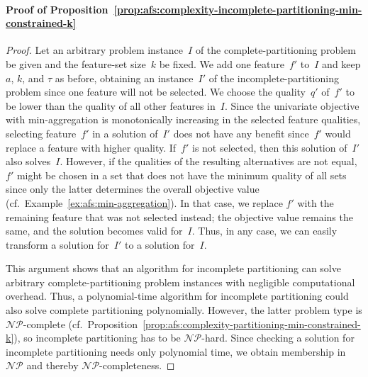 \documentclass{article}
\theoremstyle{definition}
\begin{document}
\paragraph{Proof of Proposition~\ref{prop:afs:complexity-incomplete-partitioning-min-constrained-k}}
%
\begin{proof}
Let an arbitrary problem instance~$I$ of the complete-partitioning problem be given and the feature-set size~$k$ be fixed.
We add one feature~$f'$ to~$I$ and keep $a$, $k$, and $\tau$ as before, obtaining an instance~$I'$ of the incomplete-partitioning problem since one feature will not be selected.
We choose the quality~$q'$ of~$f'$ to be lower than the quality of all other features in~$I$.
Since the univariate objective with min-aggregation is monotonically increasing in the selected feature qualities, selecting feature~$f'$ in a solution of~$I'$ does not have any benefit since~$f'$ would replace a feature with higher quality.
If~$f'$ is not selected, then this solution of~$I'$ also solves~$I$.
However, if the qualities of the resulting alternatives are not equal, $f'$ might be chosen in a set that does not have the minimum quality of all sets since only the latter determines the overall objective value (cf.~Example~\ref{ex:afs:min-aggregation}).
In that case, we replace $f'$ with the remaining feature that was not selected instead; the objective value remains the same, and the solution becomes valid for~$I$.
Thus, in any case, we can easily transform a solution for~$I'$ to a solution for~$I$.
	
This argument shows that an algorithm for incomplete partitioning can solve arbitrary complete-partitioning problem instances with negligible computational overhead.
Thus, a polynomial-time algorithm for incomplete partitioning could also solve complete partitioning polynomially.
However, the latter problem type is $\mathcal{NP}$-complete (cf.~Proposition~\ref{prop:afs:complexity-partitioning-min-constrained-k}), so incomplete partitioning has to be $\mathcal{NP}$-hard.
Since checking a solution for incomplete partitioning needs only polynomial time, we obtain membership in $\mathcal{NP}$ and thereby $\mathcal{NP}$-completeness.
\end{proof}
\end{document}
